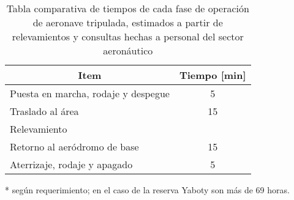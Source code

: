 \begin{table}[]
    \begin{threeparttable}[b]
        \centering
        \caption{Tabla comparativa de tiempos de cada fase de operación de aeronave tripulada, estimados a partir de relevamientos y consultas hechas a personal del sector aeronáutico}
        \label{tab:avion}
        \begin{tabular}{lc}
            \hline
            \multicolumn{1}{c}{\textbf{Item}}   & \multicolumn{1}{l}{\textbf{Tiempo {[}min{]}}} \\ \hline
            \rowcolor[HTML]{FFFFFF} 
            Puesta en marcha, rodaje y despegue & 5                                             \\
            \rowcolor[HTML]{FFFFFF} 
            Traslado al área                    & 15                                            \\
            \rowcolor[HTML]{FFFFFF} 
            Relevamiento                        & {\color[HTML]{000000} \tnote{*}}                      \\
            \rowcolor[HTML]{FFFFFF} 
            Retorno al aeródromo de base        & {\color[HTML]{000000} 15}                     \\
            \rowcolor[HTML]{FFFFFF} 
            Aterrizaje, rodaje y apagado        & {\color[HTML]{000000} 5}                      \\ \hline
        \end{tabular}
         \begin{tablenotes}
            \tiny{
           \item [*]según requerimiento; en el caso de la reserva Yaboty son más de 69 horas.
                    }
         \end{tablenotes}
     \end{threeparttable}
\end{table}